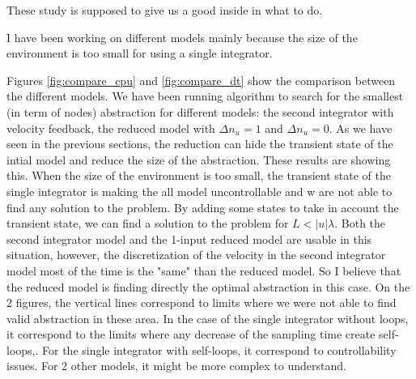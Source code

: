 These study is supposed to give us a good inside in what to do.

I have been working on different models mainly because the size of the environment is  too small for using a single integrator.


Figures \ref{fig:compare_cpu} and \ref{fig:compare_dt} show the comparison between the different models. We have been running algorithm to search for the smallest (in term of nodes) abstraction for different models: the second integrator with velocity feedback, the reduced model with $\Delta n_u = 1$ and $\Delta n_u = 0$.
As we have seen in the previous sections, the reduction can hide the transient state of the intial model and reduce the size of the abstraction.
These results are showing this.
When the size of the environment is too small, the transient state of the single integrator is making the all model uncontrollable and w are not able to find any solution to the problem.
By adding some states to take in account the transient state, we can find a solution to the problem for $L<|u| \lambda$. Both the second integrator model and the 1-input reduced model are usable in this situation, however, the discretization of the velocity in the second integrator model most of the time is the "same" than the reduced model. So I believe that the reduced model is finding directly the optimal abstraction in this case.
On the 2 figures, the vertical lines correspond to limits where we were not able to find valid abstraction in these area. In the case of the single integrator without loops, it correspond to the limits where any decrease of the sampling time create self-loops,. For the single integrator with self-loops, it correspond to controllability issues. For 2 other models, it might be more complex to understand.



